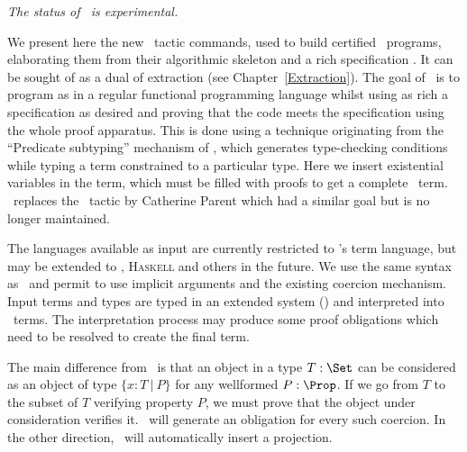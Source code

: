 \achapter{\Program{}}
\label{Program}

\begin{flushleft}
  \em The status of \Program\ is experimental.
\end{flushleft}

We present here the new \Program\ tactic commands, used to build certified
\Coq\ programs, elaborating them from their algorithmic skeleton and a
rich specification \cite{Sozeau06}. It can be sought of as a dual of extraction
(see Chapter~\ref{Extraction}). The goal of \Program~is to program as in a regular
functional programming language whilst using as rich a specification as 
desired and proving that the code meets the specification using the whole \Coq{} proof
apparatus. This is done using a technique originating from the
``Predicate subtyping'' mechanism of \PVS \cite{Rushby98}, which generates type-checking
conditions while typing a term constrained to a particular type. 
Here we insert existential variables in the term, which must be filled
with proofs to get a complete \Coq\ term. \Program\ replaces the
\Program\ tactic by Catherine Parent \cite{Parent95b} which had a similar goal but is no longer
maintained.

The languages available as input are currently restricted to \Coq's term
language, but may be extended to \ocaml{}, \textsc{Haskell} and others
in the future. We use the same syntax as \Coq\ and permit to use implicit
arguments and the existing coercion mechanism.
Input terms and types are typed in an extended system (\Russell) and
interpreted into \Coq\ terms. The interpretation process may produce
some proof obligations which need to be resolved to create the final term.

The main difference from \Coq\ is that an object in a type $T : \Set$
can be considered as an object of type $\{ x : T~|~P\}$ for any
wellformed $P : \Prop$. 
If we go from $T$ to the subset of $T$ verifying property $P$, we must
prove that the object under consideration verifies it. \Russell\ will
generate an obligation for every such coercion. In the other direction,
\Russell\ will automatically insert a projection.

